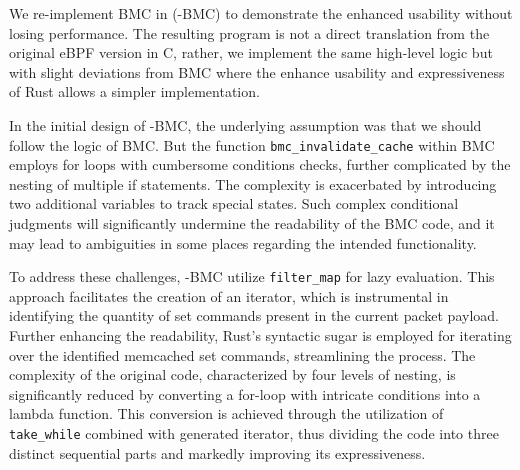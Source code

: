 We re-implement BMC in \projname{} (\projname{}-BMC) to demonstrate the
    enhanced usability without losing performance.
The resulting program is not a direct translation from the original eBPF
    version in C, rather, we implement the same high-level logic but with
    slight deviations from BMC where the enhance usability and expressiveness
    of Rust allows a simpler implementation.



In the initial design of \projname{}-BMC, the underlying assumption was that 
    we should follow the logic of BMC.
But the function \texttt{bmc\_invalidate\_cache} within BMC employs 
    for loops with cumbersome conditions checks, further 
    complicated by the nesting of multiple if statements. The complexity is 
    exacerbated by introducing two additional variables to track special states. 
Such complex conditional judgments will significantly undermine the readability 
    of the BMC code, and it may lead to ambiguities in some places regarding 
    the intended functionality. 



To address these challenges, \projname{}-BMC 
    utilize \texttt{filter\_map} for lazy evaluation. 
This approach facilitates the creation of an iterator, which is instrumental in identifying 
    the quantity of set commands present in the current packet payload. 
Further enhancing the readability, Rust's syntactic sugar is employed for 
    iterating over the identified memcached set commands, streamlining the process. 
The complexity of the original code, characterized by four levels of nesting, 
    is significantly reduced by converting a for-loop with intricate conditions 
    into a lambda function. 
This conversion is achieved through the utilization of \texttt{take\_while} 
    combined with generated iterator, thus dividing the code into three distinct 
    sequential parts and markedly improving its expressiveness.
    
